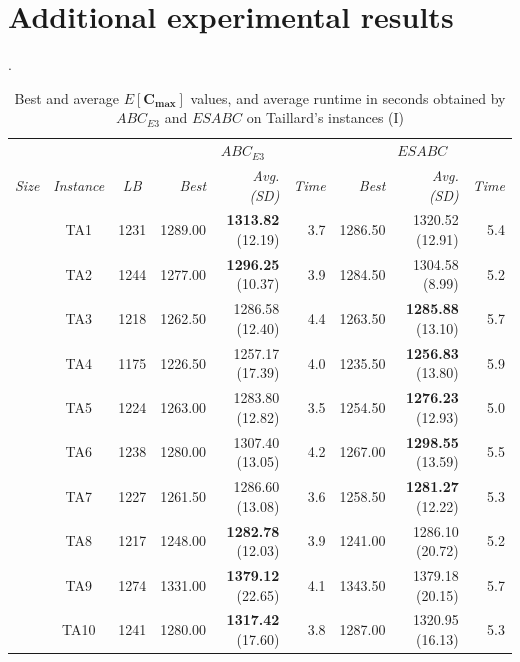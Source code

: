 \documentclass[icae]{iosart2x}
\newcommand{\reviewed}[1]{#1} %
\begin{document}
\begin{appendix}\label{appendix}
\section{\reviewed{Additional experimental results}}

\begin{table}[htb]
\small
\centering
\caption{\reviewed{Best and average $E[\mathbf{C_{max}}]$ values, and average runtime in seconds obtained by $ABC_{E3}$ and $ESABC$ on Taillard's instances (I)}}.
\setlength{\tabcolsep}{1.5mm}%
\label{table:expResultsTaillard1}
\begin{tabular}{c|c|c|rrr|rrr}
\toprule
& & & \multicolumn{3}{c|}{$ABC_{E3}$ }& \multicolumn{3}{c}{$ESABC$} \\
\textit{Size}& \textit{Instance} & \textit{LB} & \textit{Best} & \textit{Avg. \tiny{(SD)}} & \textit{Time} & \textit{Best} & \textit{Avg. \tiny{(SD)}} & \textit{Time} \\
\midrule
\parbox[t]{2mm}{}
 & TA1 & 1231 & 1289.00 & \textbf{1313.82} \tiny{(12.19)} & 3.7 & 1286.50 & 1320.52 \tiny{(12.91)} & 5.4\\
 & TA2 & 1244 & 1277.00 & \textbf{1296.25} \tiny{(10.37)} & 3.9 & 1284.50 & 1304.58 \tiny{(8.99)} & 5.2\\
 & TA3 & 1218 & 1262.50 & 1286.58 \tiny{(12.40)} & 4.4 & 1263.50 & \textbf{1285.88} \tiny{(13.10)} & 5.7\\
 & TA4 & 1175 & 1226.50 & 1257.17 \tiny{(17.39)} & 4.0 & 1235.50 & \textbf{1256.83} \tiny{(13.80)} & 5.9\\
 & TA5 & 1224 & 1263.00 & 1283.80 \tiny{(12.82)} & 3.5 & 1254.50 & \textbf{1276.23} \tiny{(12.93)} & 5.0\\
 & TA6 & 1238 & 1280.00 & 1307.40 \tiny{(13.05)} & 4.2 & 1267.00 & \textbf{1298.55} \tiny{(13.59)} & 5.5\\
 & TA7 & 1227 & 1261.50 & 1286.60 \tiny{(13.08)} & 3.6 & 1258.50 & \textbf{1281.27} \tiny{(12.22)} & 5.3\\
 & TA8 & 1217 & 1248.00 & \textbf{1282.78} \tiny{(12.03)} & 3.9 & 1241.00 & 1286.10 \tiny{(20.72)} & 5.2\\
 & TA9 & 1274 & 1331.00 & \textbf{1379.12} \tiny{(22.65)} & 4.1 & 1343.50 & 1379.18 \tiny{(20.15)} & 5.7\\
 & TA10 & 1241 & 1280.00 & \textbf{1317.42} \tiny{(17.60)} & 3.8 & 1287.00 & 1320.95 \tiny{(16.13)} & 5.3\\

\end{tabular}
\end{table}
\end{appendix}
\end{document}
